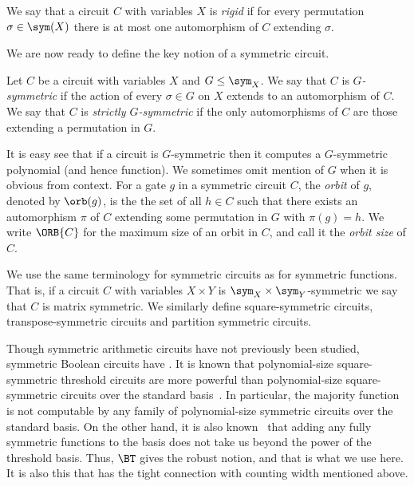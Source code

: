 \documentclass{toc}
\begin{document}
We say that a circuit $C$ with variables $X$ is \emph{rigid} if for every
permutation $\sigma \in \sym(X)$ there is at most one automorphism of $C$
extending $\sigma$.

We are now ready to define the key notion of a symmetric circuit.
\begin{definition}
  Let $C$ be a circuit with variables $X$ and $G \leq \sym_X$. We say that
  $C$ is
  \emph{$G$-symmetric} if the action of every $\sigma \in G$ on $X$ extends to
  an automorphism of $C$. We say that $C$ is \emph{strictly $G$-symmetric} if the only automorphisms of $C$ are those extending a permutation in $G$.
\end{definition}

It is easy see that if a circuit is $G$-symmetric then it computes a
$G$-symmetric polynomial (and hence function). We sometimes omit mention of $G$
when it is obvious from context. For a gate $g$ in a symmetric circuit $C$, the
\emph{orbit} of $g$, denoted by $\orb(g)$, is the the set of all $h \in C$ such
that there exists an automorphism $\pi$ of $C$ extending some permutation in $G$ with $\pi(g) = h$. We write
$\ORB{C}$ for the maximum size of an orbit in $C$, and call it the \emph{orbit
  size} of $C$.

We use the same terminology for symmetric circuits as for symmetric functions.
That is, if a circuit $C$ with variables $X \times Y$ is $\sym_X \times
\sym_Y$-symmetric we say that $C$ is matrix symmetric. We similarly define
square-symmetric circuits, transpose-symmetric circuits and partition symmetric circuits. 

Though symmetric arithmetic circuits have not previously been studied, symmetric
Boolean circuits have \cite{DenenbergGS86,Otto96,AndersonD17,Rossman19}. It is known that
polynomial-size square-symmetric threshold circuits are more powerful than
polynomial-size square-symmetric circuits over the standard basis~\cite{AndersonD17}.
In particular, the majority function is not computable by any family of
polynomial-size symmetric circuits over the standard basis. On the other hand,
it is also known~\cite{DawarW22} that adding any fully symmetric functions to
the basis does not take us beyond the power of the threshold basis. Thus, $\BT$
gives the robust notion, and that is what we use here. It is also this that has
the tight connection with counting width mentioned above.

%

%
%
%

%
%
%
%
%
%
%
%
%
%
%
\end{document}
